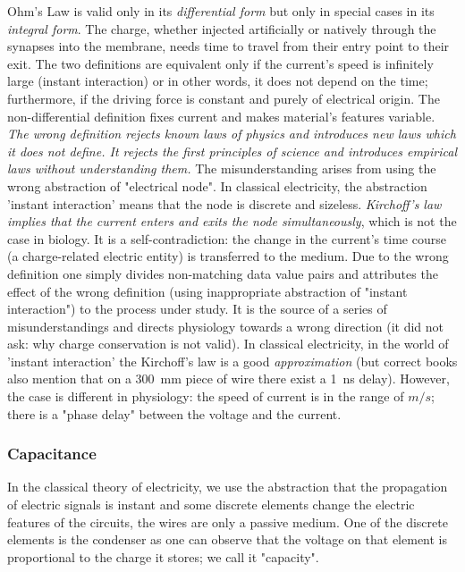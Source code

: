 Ohm's Law is valid only in its \textit{differential form} but only in special cases in its \textit{integral form}. 
The charge, whether injected artificially or natively through the synapses into the membrane,
needs time to travel from their entry point to their exit.
The two definitions are equivalent only if the current's speed is infinitely large (instant interaction) or in other words, it does not depend on the time; furthermore, if the driving force is constant and purely of electrical origin.
The non-differential definition fixes current
and makes material's features variable. \textit{The wrong definition rejects known laws of physics and introduces 
new laws which it does not define.
It rejects the first principles of science and introduces empirical laws without understanding them.}
%
The misunderstanding arises from using the wrong abstraction of "electrical
node". In classical electricity, the abstraction
'instant interaction' means that the node is discrete and sizeless. \textit{Kirchoff's law implies that the current enters and exits the node simultaneously}, which is not 
the case in biology. It is a self-contradiction:
the change in the current's time course (a charge-related electric entity)
is transferred to the medium.
Due to the wrong definition one simply divides non-matching data value pairs and
attributes the effect of the wrong definition (using inappropriate abstraction of "instant interaction") to the process under study.
It is the source of a series of misunderstandings
and directs physiology towards a wrong direction (it did not ask:
why charge conservation is not valid).
In classical electricity, in the world of 'instant interaction' the Kirchoff's law is a
good \textit{approximation} (but correct books also mention that on a 
\SI{300}{\milli\meter} %
piece of wire there exist a \SI{1}{\nano\second} delay).
However, the case is different in physiology: the speed of current is in the range of $m/s$; there is a "phase delay"
between the voltage and the current. 


\subsubsection[Capacitance]{Capacitance\label{sec:PHYSICS_MEASURINGSAPACITANCE}}

In the classical theory of electricity, we use the abstraction that
the propagation of electric signals is instant and some
discrete elements change the electric features of the circuits,
the wires are only a passive medium. One of the discrete elements is 
the condenser as one can observe that the voltage on that element 
is proportional to the charge it stores; we call it "capacity".

